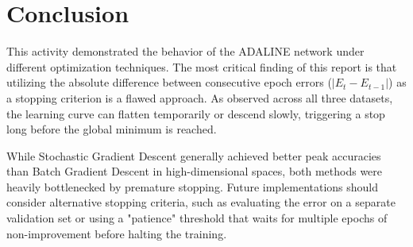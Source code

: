 \documentclass[12pt, a4paper]{article}
\begin{document}
\section{Conclusion}
This activity demonstrated the behavior of the ADALINE network under different optimization techniques. The most critical finding of this report is that utilizing the absolute difference between consecutive epoch errors ($|E_t - E_{t-1}|$) as a stopping criterion is a flawed approach. As observed across all three datasets, the learning curve can flatten temporarily or descend slowly, triggering a stop long before the global minimum is reached. 

While Stochastic Gradient Descent generally achieved better peak accuracies than Batch Gradient Descent in high-dimensional spaces, both methods were heavily bottlenecked by premature stopping. Future implementations should consider alternative stopping criteria, such as evaluating the error on a separate validation set or using a "patience" threshold that waits for multiple epochs of non-improvement before halting the training.
\end{document}
